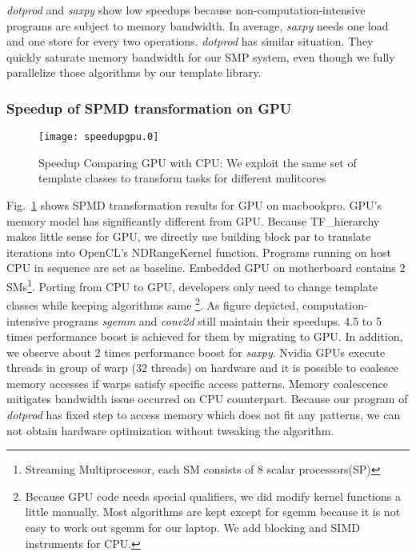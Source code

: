 \textit{dotprod} and \textit{saxpy} show low speedups because non-computation-intensive
programs are subject to memory bandwidth.  In average, \textit{saxpy} needs one load and one 
store for every two operations. \textit{dotprod} has similar
situation. They quickly saturate memory bandwidth for our SMP system, even though we fully parallelize those
algorithms by our template library. 

\subsubsection{Speedup of  SPMD transformation on GPU}
\begin{figure}
\texttt{[image: speedupgpu.0]}
\caption{Speedup Comparing GPU with CPU: We exploit the same set of
  template classes to transform tasks for different mulitcores}\label{fig:spdgpu}
\end{figure}

Fig.~\ref{fig:spdgpu} shows SPMD transformation results for GPU on
macbookpro. GPU's memory model has significantly different from
GPU. Because TF\_hierarchy makes little sense for GPU, we directly use building
block par to translate iterations into OpenCL's NDRangeKernel
function. Programs running on host CPU  in sequence are set as
baseline. Embedded GPU on motherboard contains 2
SMs\footnote{Streaming Multiprocessor, each SM consists of 8 scalar processors(SP)}.
Porting from CPU to GPU, developers only need to change
template classes while keeping algorithms same \footnote{
Because GPU code needs special qualifiers, we did modify kernel
functions a little manually.  Most algorithms are kept except for
sgemm because it is not easy
 to work out sgemm for our laptop.  We add blocking and SIMD
 instruments for CPU.}. As figure depicted,  computation-intensive programs
\textit{sgemm} and \textit{conv2d} still maintain their speedups. 4.5 to 5 times
performance boost is achieved for them by migrating to GPU.
In addition, we observe about 2 times performance boost for
\textit{saxpy}. Nvidia GPUs execute
threads in group of warp (32 threads) on hardware and it is
possible to coalesce memory accesses if warps satisfy
specific access patterns. Memory coalescence mitigates bandwidth issue
occurred on CPU counterpart. Because our program of \textit{dotprod} has fixed
step to access memory which does not fit any patterns, we can not
obtain hardware optimization without tweaking the algorithm.

